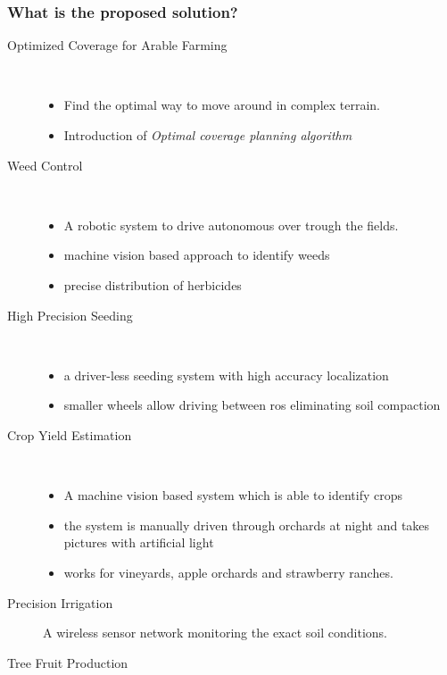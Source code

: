     \subsubsection*{What is the proposed solution?}
    \begin{description}
    
        \item[Optimized Coverage for Arable Farming] \
        \begin{itemize}
            \item Find the optimal way to move around in complex terrain.
            \item Introduction of \emph{Optimal coverage planning algorithm}
        \end{itemize}
        \item[Weed Control]\
        \begin{itemize}
            \item A robotic system to drive autonomous over trough the fields.
            \item machine vision based approach to identify weeds
            \item precise distribution of herbicides
        \end{itemize}
        \item[High Precision Seeding]\
        \begin{itemize}
            \item a driver-less seeding system with high accuracy localization
            \item smaller wheels allow driving between ros eliminating soil compaction 
        \end{itemize}
        \item[Crop Yield Estimation]\
        \begin{itemize}
            \item A machine vision based system which is able to identify crops
            \item the system is manually driven through orchards at night and takes pictures with artificial light
            \item works for vineyards, apple orchards and strawberry ranches.
        \end{itemize} 
        \item[Precision Irrigation] A wireless sensor network monitoring the exact soil conditions.
        \item[Tree Fruit Production] \
        \begin{itemize}

\end{itemize}
\end{description}
